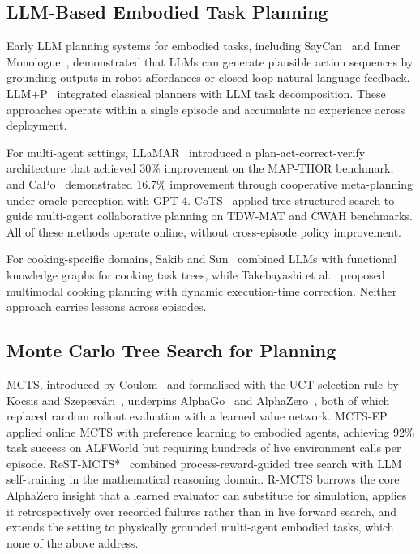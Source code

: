 \documentclass[pdflatex,sn-mathphys-num]{sn-jnl}
\theoremstyle{thmstyleone}
\theoremstyle{thmstyletwo}
\theoremstyle{thmstylethree}
\newcommand{\RMCTS}{\textsc{R-MCTS}}
\begin{document}
\subsection{LLM-Based Embodied Task Planning}

Early LLM planning systems for embodied tasks, including
SayCan~\cite{ahn2022can} and Inner Monologue~\cite{huang2022inner},
demonstrated that LLMs can generate plausible action sequences by
grounding outputs in robot affordances or closed-loop natural language
feedback. LLM+P~\cite{liu2023llmp} integrated classical planners with
LLM task decomposition.
These approaches operate within a single episode and accumulate no
experience across deployment.

For multi-agent settings, LLaMAR~\cite{nayak2024llamar} introduced a
plan-act-correct-verify architecture that achieved 30\% improvement on
the MAP-THOR benchmark, and CaPo~\cite{liu2025capo} demonstrated 16.7\%
improvement through cooperative meta-planning under oracle perception
with GPT-4.
CoTS~\cite{zu2025collaborative} applied tree-structured search to guide
multi-agent collaborative planning on TDW-MAT and CWAH benchmarks.
All of these methods operate online, without cross-episode policy
improvement.

For cooking-specific domains, Sakib and Sun~\cite{sakib2024cooking}
combined LLMs with functional knowledge graphs for cooking task trees,
while Takebayashi et al.~\cite{takebayashi2025cooking} proposed
multimodal cooking planning with dynamic execution-time correction.
Neither approach carries lessons across episodes.

\subsection{Monte Carlo Tree Search for Planning}

MCTS, introduced by Coulom~\cite{coulom2006efficient} and formalised
with the UCT selection rule by Kocsis and
Szepesv\'{a}ri~\cite{kocsis2006bandit}, underpins
AlphaGo~\cite{silver2016mastering} and
AlphaZero~\cite{schrittwieser2020mastering}, both of which replaced
random rollout evaluation with a learned value network.
MCTS-EP~\cite{xu2025mcts} applied online MCTS with preference learning
to embodied agents, achieving 92\% task success on ALFWorld but
requiring hundreds of live environment calls per episode.
ReST-MCTS*~\cite{zhang2024rest} combined process-reward-guided tree
search with LLM self-training in the mathematical reasoning domain.
\RMCTS{} borrows the core AlphaZero insight that a learned evaluator can
substitute for simulation, applies it retrospectively over recorded
failures rather than in live forward search, and extends the setting to
physically grounded multi-agent embodied tasks, which none of the above
address.
\end{document}
